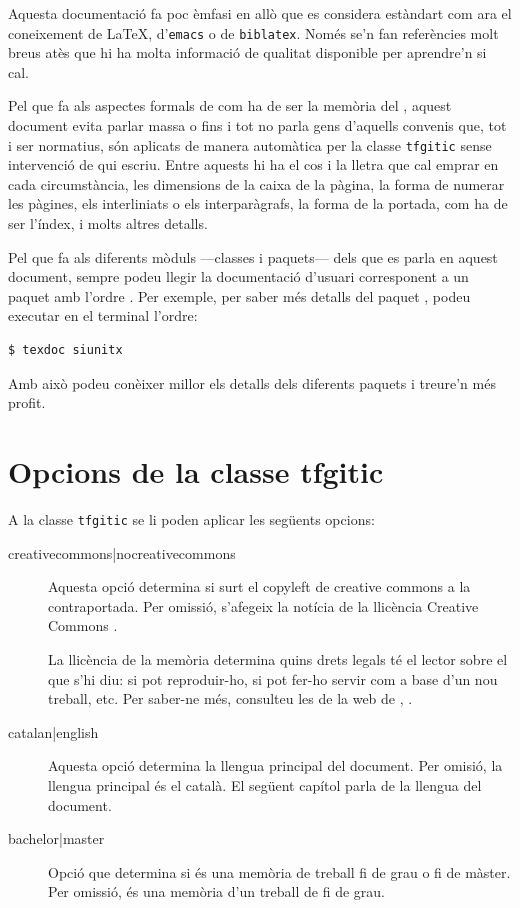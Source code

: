 \documentclass{tfgitic}
\begin{document}
Aquesta documentació fa poc èmfasi en allò que es considera estàndart
com ara el coneixement de \LaTeX{}, d'\texttt{emacs} o de
\texttt{biblatex}. Només se'n fan referències molt breus atès que hi
ha molta informació de qualitat disponible per aprendre'n si cal.

Pel que fa als aspectes formals de com ha de ser la memòria del
, aquest document evita parlar massa o fins i tot no parla
gens d'aquells convenis que, tot i ser normatius, són aplicats de
manera automàtica per la classe \texttt{tfgitic} sense intervenció de
qui escriu. Entre aquests hi ha el cos i la lletra que cal emprar en
cada circumstància, les dimensions de la caixa de la pàgina, la forma
de numerar les pàgines, els interliniats o els interparàgrafs, la
forma de la portada, com ha de ser l'índex, i molts altres
detalls.

Pel que fa als diferents mòduls ---classes i paquets--- dels que es
parla en aquest document, sempre podeu llegir la documentació d'usuari
corresponent a un paquet amb l'ordre . Per exemple, per
saber més detalls del paquet , podeu executar en el
terminal l'ordre:
\begin{verbatim}
$ texdoc siunitx
\end{verbatim}
Amb això podeu conèixer millor els detalls dels diferents paquets i
treure'n més profit.

\section{Opcions de la classe tfgitic}

A la classe \texttt{tfgitic} se li poden aplicar les següents opcions:
\begin{description}
\item[creativecommons|nocreativecommons] Aquesta opció determina si
  surt el copyleft de creative commons a la contraportada. Per omissió,
  s'afegeix la notícia de la llicència Creative Commons
  .

  La llicència de la memòria determina quins drets legals té el lector
  sobre el que s'hi diu: si pot reproduir-ho, si pot fer-ho servir com
  a base d'un nou treball, etc. Per saber-ne més, consulteu les
   de la web de ,
  \cite{cc22:_creat_comm_web}.

\item[catalan|english] Aquesta opció determina la llengua principal
  del document. Per omisió, la llengua principal és el català. El
  següent capítol parla de la llengua del document.

\item[bachelor|master] Opció que determina si és una memòria de
  treball fi de grau o fi de màster. Per omissió, és una memòria d'un
  treball de fi de grau.
\end{description}
\end{document}
